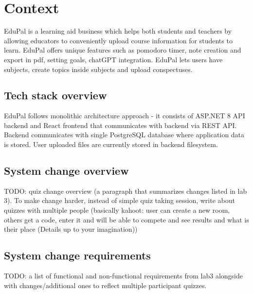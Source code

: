 \section{Context}

EduPal is a learning aid business which helps both students and teachers by allowing educators to conveniently upload course information for students to learn. EduPal offers unique features such as pomodoro timer, note creation and export in pdf, setting goals, chatGPT integration. EduPal lets users have subjects, create topics inside subjects and upload conspectuses.

\subsection{Tech stack overview}

EduPal follows monolithic architecture approach - it consists of ASP.NET 8 API backend and React frontend that communicates with backend via REST API. Backend communicates with single PostgreSQL database where application data is stored. User uploaded files are currently stored in backend filesystem.

\subsection{System change overview}

TODO: quiz change overview (a paragraph that summarizes changes listed in lab 3). To make change harder, instead of simple quiz taking session, write about quizzes with multiple people (basically kahoot: user can create a new room, others get a code, enter it and will be able to compete and see results and what is their place (Details up to your imagination))

\subsection{System change requirements}

TODO: a list of functional and non-functional requirements from lab3 alongside with changes/additional ones to reflect multiple participant quizzes.
